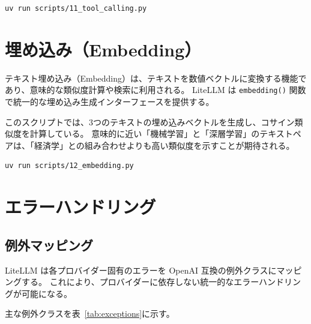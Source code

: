 \documentclass[a4paper,11pt]{ltjsarticle}
\newcommand{\code}[1]{\texttt{#1}}
\begin{document}
\begin{lstlisting}[style=bash]
uv run scripts/11_tool_calling.py
\end{lstlisting}


\section{埋め込み（Embedding）}
\label{sec:embedding}

テキスト埋め込み（Embedding）は、テキストを数値ベクトルに変換する機能であり、意味的な類似度計算や検索に利用される。
LiteLLM は \code{embedding()} 関数で統一的な埋め込み生成インターフェースを提供する。



このスクリプトでは、3つのテキストの埋め込みベクトルを生成し、コサイン類似度を計算している。
意味的に近い「機械学習」と「深層学習」のテキストペアは、「経済学」との組み合わせよりも高い類似度を示すことが期待される。

\begin{lstlisting}[style=bash]
uv run scripts/12_embedding.py
\end{lstlisting}


\section{エラーハンドリング}
\label{sec:error_handling}

\subsection{例外マッピング}
\label{subsec:exception_mapping}

LiteLLM は各プロバイダー固有のエラーを OpenAI 互換の例外クラスにマッピングする。
これにより、プロバイダーに依存しない統一的なエラーハンドリングが可能になる。

主な例外クラスを表~\ref{tab:exceptions}に示す。
\end{document}
